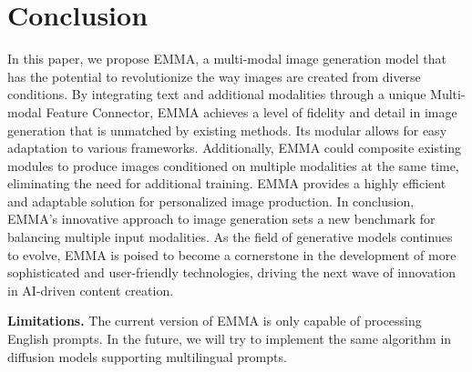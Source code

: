 \section{Conclusion}\label{sec:conclusion}
In this paper, we propose EMMA, a multi-modal image generation model that has the potential to revolutionize the way images are created from diverse conditions. By integrating text and additional modalities through a unique Multi-modal Feature Connector, EMMA achieves a level of fidelity and detail in image generation that is unmatched by existing methods. Its modular allows for easy adaptation to various frameworks. Additionally, EMMA could composite existing modules to produce images conditioned on multiple modalities at the same time, eliminating the need for additional training. EMMA provides a highly efficient and adaptable solution for personalized image production.
In conclusion, EMMA's innovative approach to image generation sets a new benchmark for balancing multiple input modalities. As the field of generative models continues to evolve, EMMA is poised to become a cornerstone in the development of more sophisticated and user-friendly technologies, driving the next wave of innovation in AI-driven content creation.

\textbf{Limitations.} The current version of EMMA is only capable of processing English prompts. In the future, we will try to implement the same algorithm in diffusion models supporting multilingual prompts. 